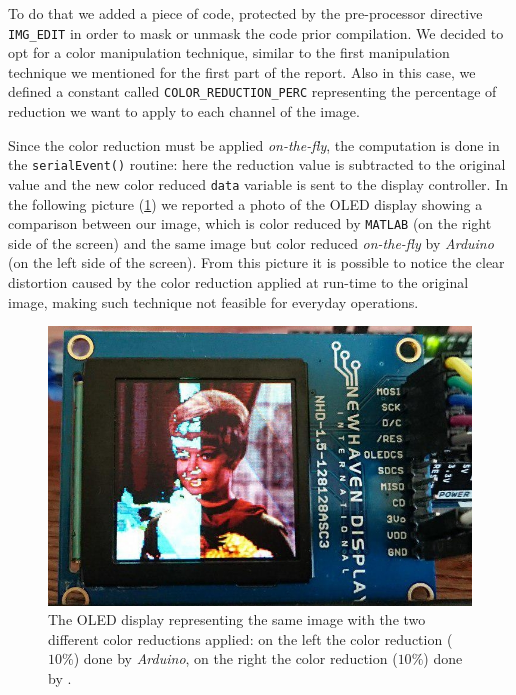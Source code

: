 \documentclass[a4paper]{article}
\begin{document}
            To do that we added a piece of code, protected by the pre-processor directive \texttt{IMG\_EDIT} in order to mask or unmask the code prior compilation.
            We decided to opt for a color manipulation technique, similar to the first manipulation technique we mentioned for the first part of the report. Also in this case, we defined a constant called \texttt{COLOR\_REDUCTION\_PERC} representing the percentage of reduction we want to apply to each channel of the image.

            Since the color reduction must be applied \emph{on-the-fly}, the computation is done in the \texttt{serialEvent()} routine: here the reduction value is subtracted to the original value and the new color reduced \texttt{data} variable is sent to the display controller. In the following picture (\ref{fig:ColorReductionComparison}) we reported a photo of the OLED display showing a comparison between our image, which is color reduced by \texttt{MATLAB} (on the right side of the screen) and the same image but color reduced \emph{on-the-fly} by \emph{Arduino} (on the left side of the screen).
            From this picture it is possible to notice the clear distortion caused by the color reduction applied at run-time to the original image, making such technique not feasible for everyday operations.

            \begin{figure}[htp]
                \centering
                \includegraphics[width=0.4 \columnwidth]{./screenshots/ColorReductionComparison}
                \caption{
                        \label{fig:ColorReductionComparison}
                        The OLED display representing the same image with the two different color reductions applied: on the left the color reduction ($10\%$) done by \emph{Arduino}, on the right the color reduction ($10\%$) done by .
                }
            \end{figure}
\end{document}
